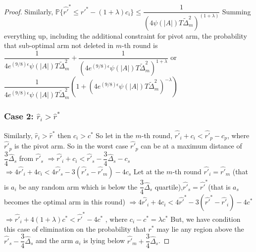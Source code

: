 \begin{proof}
\newline Similarly, $\mathbb{P} \lbrace \hat{r'}^{*} \leq r'^{*} - (1+\lambda)c_{i} \rbrace\leq \dfrac{1}{(4\psi(|A|)T\tilde{\Delta}_{m}^{2})^{(1+\lambda)}}$
\newline
Summing everything up, including the additional constraint for pivot arm, the probability that sub-optimal arm not deleted in $m$-th round is $\dfrac{1}{4 e^{(9/8)\epsilon} \psi(|A|)T\tilde{\Delta}_{m}^{2}} + \dfrac{1}{(4 e^{(9/8)\epsilon} \psi(|A|)T\tilde{\Delta}_{m}^{2})^{1+\lambda}}$ or $\dfrac{1}{4 e^{(9/8)\epsilon} \psi(|A|)T\tilde{\Delta}_{m}^{2}}(1+(4e^{(9/8)\epsilon} \psi(|A|)T\tilde{\Delta}_{m}^{2})^{-\lambda})$

\subsubsection*{\textbf{Case 2: $\hat{r}_{i} > \hat{r}^{*}$}}
Similarly, $\hat{r}_{i}> \hat{r}^{*}$ then $c_{i}>c^{*}$
\newline
So let in the $m$-th round,
\newline
\hspace*{8em}$\hat{r'}_{i}+c_{i} < \hat{r'}_{p}-c_{p}$, where $\hat{r'}_{p}$ is the pivot arm. So in the worst case $\hat{r'}_{p}$ can be at a maximum distance of $\dfrac{3}{4}\hat{\Delta}_{s}$ from $\hat{r'}_{s}$ 
\newline \hspace*{8em}$\Rightarrow \hat{r'}_{i} + c_{i} <  \hat{r'}_{s} - \dfrac{3}{4}\hat{\Delta}_{s} - c_{s}$
\newline \hspace*{8em}$\Rightarrow 4\hat{r'}_{i} + 4c_{i} < 4\hat{r'}_{s} - 3(\hat{r'}_{s}-\hat{r'}_{m}) - 4c_{s}$
\newline Let at the $m$-th round $\hat{r'}_{i}=\hat{r'}_{m}$ (that is $a_{i}$ be any random arm which is below the $\dfrac{3}{4}\hat{\Delta}_{s}$ quartile),$\hat{r'}_{s}=\hat{r'}^{*}$(that is $a_{s}$ becomes the optimal arm in this round)
\newline \hspace*{8em}$\Rightarrow 4\hat{r'}_{i} + 4c_{i} < 4\hat{r'}^{*} - 3(\hat{r'}^{*}-\hat{r'}_{i}) - 4c^{*}$
\newline \hspace*{8em}$\Rightarrow \hat{r'}_{i} + 4(1+\lambda)c^{*} < \hat{r'}^{*} - 4c^{*}$ , where $c_{i}-c^{*}=\lambda c^{*}$
\newline
But, we have condition this case of elimination on the probability that $r^{*}$ may lie any region above the $\hat{r'}_{s} - \dfrac{3}{4}\hat{\Delta}_{s}$ and the arm $a_{i}$ is lying below $\hat{r'}_{m}+\dfrac{3}{4}\hat{\Delta}_{s}$.

\end{proof}
